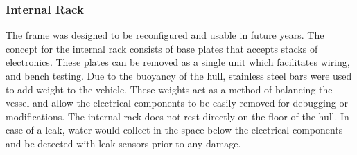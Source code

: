 \subsubsection{Internal Rack}
The frame was designed to be reconfigured and usable in
future years. The concept for the internal rack consists of base plates that 
accepts stacks of electronics.  These plates can be removed as a single unit which 
facilitates wiring, and bench testing.  Due to the buoyancy of the hull, 
stainless steel bars were used to add weight to the vehicle. These weights act as 
a method of balancing the vessel and allow the electrical components to be easily 
removed for debugging or modifications. The internal rack does not rest directly 
on the floor of the hull. In case of a leak, water would collect in the space
below the electrical components and be detected with leak sensors
prior to any damage.
